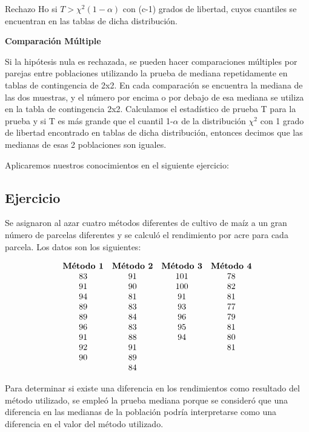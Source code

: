 \documentclass[a4paper,oneside,openany]{book}
\begin{document}
Rechazo Ho si \(T> \chi^2(1-\alpha)\) con (c-1) grados de libertad,
cuyos cuantiles se encuentran en las tablas de dicha distribución.

\textbf{Comparación Múltiple}

Si la hipótesis nula es rechazada, se pueden hacer comparaciones
múltiples por parejas entre poblaciones utilizando la prueba de mediana
repetidamente en tablas de contingencia de 2x2. En cada comparación se
encuentra la mediana de las dos muestras, y el número por encima o por
debajo de esa mediana se utiliza en la tabla de contingencia 2x2.
Calculamos el estadístico de prueba T para la prueba y si T es más
grande que el cuantil 1-\(\alpha\) de la distribución \(\chi^2\) con 1
grado de libertad encontrado en tablas de dicha distribución, entonces
decimos que las medianas de esas 2 poblaciones son iguales.

Aplicaremos nuestros conocimientos en el siguiente ejercicio:

\subsection{Ejercicio}\label{ejercicio-2}

Se asignaron al azar cuatro métodos diferentes de cultivo de maíz a un
gran número de parcelas diferentes y se calculó el rendimiento por acre
para cada parcela. Los datos son los siguientes:

\[
\begin{equation*}
 \begin{array}{ c c c c c } 
\textbf{Método 1} & \textbf{Método 2} & \textbf{Método 3} & \textbf{Método 4} \\ 
83 & 91 &101  &78  \\ 
91 & 90 &100 &82 \\
94 & 81 &91  &81  \\
89 & 83 &93  &77  \\
89 & 84 &96  &79 \\
96 & 83 &95 &81 \\
91 & 88 &94  &80 \\
92 & 91 & & 81 \\
90 & 89 & &  \\
   & 84 &  &  \\
\end{array}
 \end{equation*}
\]

Para determinar si existe una diferencia en los rendimientos como
resultado del método utilizado, se empleó la prueba mediana porque se
consideró que una diferencia en las medianas de la población podría
interpretarse como una diferencia en el valor del método utilizado.
\end{document}
